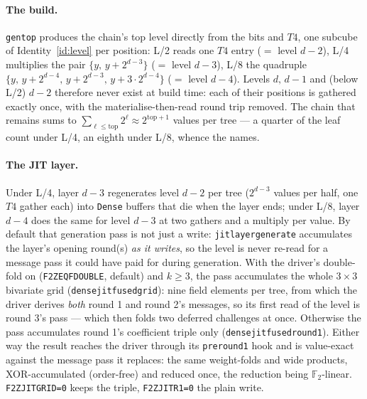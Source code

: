 \documentclass[11pt]{article}
\newcommand{\F}{\mathbb{F}}
\newcommand{\Ftwo}{\F_2}
\newcommand{\code}[1]{{\def\_{\textunderscore\allowbreak}\texttt{#1}}}
\theoremstyle{definition}
\begin{document}
\paragraph{The build.}
\code{gen\_top} produces the chain's top level directly from the bits and
$T4$, one subcube of Identity~\ref{id:level} per position: L/2 reads one
$T4$ entry ($=$ level $d{-}2$), L/4 multiplies the pair
$\{y,\, y + 2^{d-3}\}$ ($=$ level $d{-}3$), L/8 the quadruple
$\{y,\, y{+}2^{d-4},\, y{+}2^{d-3},\, y{+}3\cdot2^{d-4}\}$ ($=$ level
$d{-}4$).  Levels $d,\,d{-}1$ and (below L/2) $d{-}2$ therefore never
exist at build time: each of their positions is gathered exactly once,
with the materialise-then-read round trip removed.  The chain that
remains sums to $\sum_{\ell \le \mathrm{top}} 2^\ell \approx
2^{\mathrm{top}+1}$ values per tree --- a quarter of the leaf count
under L/4, an eighth under L/8, whence the names.

\paragraph{The JIT layer.}
Under L/4, layer $d-3$ regenerates level $d-2$ per tree ($2^{d-3}$
values per half, one $T4$ gather each) into \code{Dense} buffers that
die when the layer ends; under L/8, layer $d-4$ does the same for level
$d-3$ at two gathers and a multiply per value.  By default that
generation pass is not just a write: \code{jit\_layer\_generate}
accumulates the layer's opening round(s) \emph{as it writes}, so the
level is never re-read for a message pass it could have paid for during
generation.  With the driver's double-fold on
(\code{F2Z\_EQF\_DOUBLE}, default) and $k \ge 3$, the pass accumulates
the whole $3{\times}3$ bivariate grid (\code{dense\_jit\_fused\_grid}):
nine field elements per tree, from which the driver derives \emph{both}
round 1 and round 2's messages, so its first read of the level is round
3's pass --- which then folds two deferred challenges at once.
Otherwise the pass accumulates round 1's coefficient triple only
(\code{dense\_jit\_fused\_round1}).  Either way the result reaches the
driver through its \code{pre\_round1} hook and is value-exact against
the message pass it replaces: the same weight-folds and wide products,
XOR-accumulated (order-free) and reduced once, the reduction being
$\Ftwo$-linear.  \code{F2Z\_JIT\_GRID=0} keeps the triple,
\code{F2Z\_JIT\_R1=0} the plain write.
\end{document}
